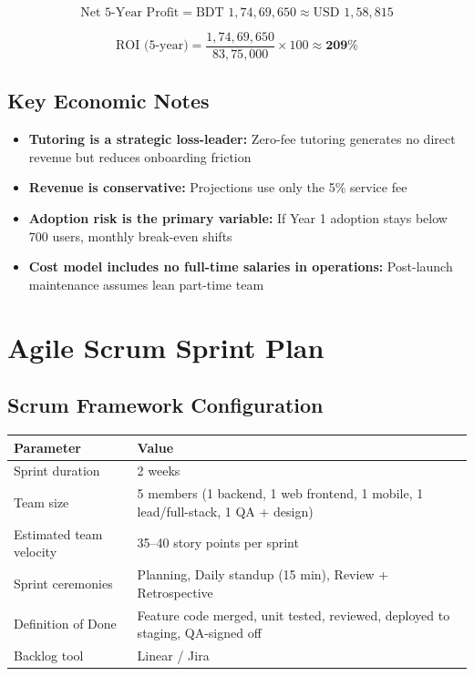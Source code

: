 \documentclass[a4paper,12pt]{article}
\begin{document}
\[
\text{Net 5-Year Profit} = \text{BDT } 1,74,69,650 \approx \text{USD } 1,58,815
\]

\[
\text{ROI (5-year)} = \frac{1,74,69,650}{83,75,000} \times 100 \approx \textbf{209\%}
\]

\subsection{Key Economic Notes}

\begin{itemize}
    \item \textbf{Tutoring is a strategic loss-leader:} Zero-fee tutoring generates no direct revenue but reduces onboarding friction
    \item \textbf{Revenue is conservative:} Projections use only the 5\% service fee
    \item \textbf{Adoption risk is the primary variable:} If Year 1 adoption stays below 700 users, monthly break-even shifts
    \item \textbf{Cost model includes no full-time salaries in operations:} Post-launch maintenance assumes lean part-time team
\end{itemize}

\section{Agile Scrum Sprint Plan}

\subsection{Scrum Framework Configuration}

\begin{table}[H]
\centering
\begin{tabular}{|l|l|}
\hline
\textbf{Parameter} & \textbf{Value} \\
\hline
Sprint duration & 2 weeks \\
Team size & 5 members (1 backend, 1 web frontend, 1 mobile, 1 lead/full-stack, 1 QA + design) \\
Estimated team velocity & 35--40 story points per sprint \\
Sprint ceremonies & Planning, Daily standup (15 min), Review + Retrospective \\
Definition of Done & Feature code merged, unit tested, reviewed, deployed to staging, QA-signed off \\
Backlog tool & Linear / Jira \\
\hline
\end{tabular}
\end{table}
\end{document}
